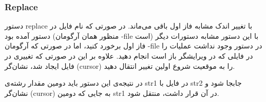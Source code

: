 \subsubsection*{{\titr Replace}}

دستور replace با تغییر اندک مشابه فاز اول باقی می‌ماند. در صورتی که نام فایل در دستور آمده بود 
(منظور همان آرگومان -file است)
با این دستور مشابه دستورات دیگر فاز اول برخورد کنید، اما در صورتی که آرگومان -file در دستور وجود نداشت عملیات را در فایلی که در ویرایشگر باز است انجام دهید. علاوه بر این در صورتی که تغییری در فایل ایجاد شد، نشان‌گر (cursor) را به موقعیت شروع اولین تغییر انتقال دهید.


در نتیجه‌ی این دستور باید دومین مقدار رشته‌ی str1 در فایل با str2 جابجا شود و نشان‌گر (cursor) به جایی که دومین str1 در آن قرار داشت، منتقل شود.